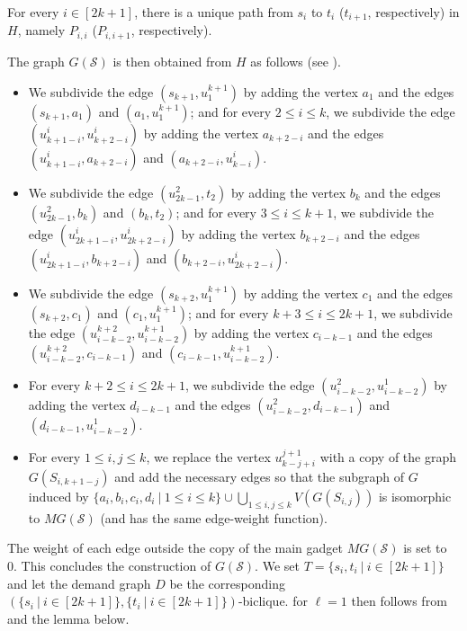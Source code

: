 \begin{observation}
\label{obs:uniqupath}
For every $i \in [2k+1]$, there is a unique path from $s_i$ to $t_i$ ($t_{i+1}$, respectively) in $H$, namely $P_{i,i}$ ($P_{i,i+1}$, respectively). 
\end{observation}

\noindent
The graph $G(\mathcal{S})$ is then obtained from $H$ as follows (see ).
\begin{itemize}
\item We subdivide the edge $(s_{k+1},u^{k+1}_1)$ by adding the vertex $a_1$ and the edges $(s_{k+1},a_1)$ and $(a_1,u^{k+1}_1)$; and for every $2 \leq i \leq k$, we subdivide the edge $(u^i_{k+1-i},u^i_{k+2-i})$ by adding the vertex $a_{k+2-i}$ and the edges $(u^i_{k+1-i},a_{k+2-i})$ and $(a_{k+2-i},u^i_{k-i})$.
\item We subdivide the edge $(u^2_{2k-1},t_2)$ by adding the vertex $b_k$ and the edges $(u^2_{2k-1},b_k)$ and $(b_k,t_2)$; and for every $3 \leq i \leq k+1$, we subdivide the edge $(u^i_{2k+1-i},u^i_{2k+2-i})$ by adding the vertex $b_{k+2-i}$ and the edges $(u^i_{2k+1-i},b_{k+2-i})$ and $(b_{k+2-i},u^i_{2k+2-i})$.
\item We subdivide the edge $(s_{k+2},u^{k+1}_1)$ by adding the vertex $c_1$ and the edges $(s_{k+2},c_1)$ and $(c_1,u^{k+1}_1)$; and for every $k+3 \leq i \leq 2k+1$, we subdivide the edge $(u^{k+2}_{i-k-2},u^{k+1}_{i-k-2})$ by adding the vertex $c_{i-k-1}$ and the edges $(u^{k+2}_{i-k-2},c_{i-k-1})$ and $(c_{i-k-1},u^{k+1}_{i-k-2})$.
\item For every $k+2 \leq i \leq 2k+1$, we subdivide the edge $(u^2_{i-k-2},u^1_{i-k-2})$ by adding the vertex $d_{i-k-1}$ and the edges $(u^2_{i-k-2},d_{i-k-1})$ and $(d_{i-k-1},u^1_{i-k-2})$.
\item For every $1\leq i,j \leq k$, we replace the vertex $u^{j+1}_{k-j+i}$ with a copy of the graph $G(S_{i,k+1-j})$ and add the necessary edges so that the subgraph of $G$ induced by $\{a_i,b_i,c_i,d_i~|~ 1 \leq i \leq k\} \cup \bigcup_{1 \leq i,j \leq k} V(G(S_{i,j}))$ is isomorphic to $MG(\mathcal{S})$ (and has the same edge-weight function).
\end{itemize}
The weight of each edge outside the copy of the main gadget $MG(\mathcal{S})$ is set to 0. This concludes the construction of $G(\mathcal{S})$. We set $T = \{s_i,t_i~|~i\in [2k+1]\}$ and let the demand graph $D$ be the corresponding $(\{s_i~|~i \in [2k+1]\},\{t_i~|~i \in [2k+1]\})$-biclique.  for $\ell=1$ then follows from  and the lemma below.

